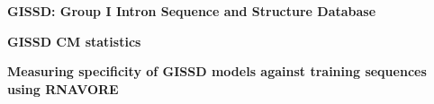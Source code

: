 \documentclass[landscape]{slides}
\begin{document}
\begin{slide}
\small
{}
\vfill
\end{slide}
\begin{slide}
\begin{center}
\small
\textbf{GISSD: Group I Intron Sequence and Structure Database}
\end{center}



\vfill
\end{slide}
\begin{slide}
\begin{center}
\small
\textbf{GISSD CM statistics}
\end{center}


\vfill
\end{slide}
\begin{slide}
\begin{center}
\small
\textbf{Measuring specificity of GISSD models against training
  sequences using RNAVORE} 
\end{center}
\vfill
\end{slide}
\end{document}
